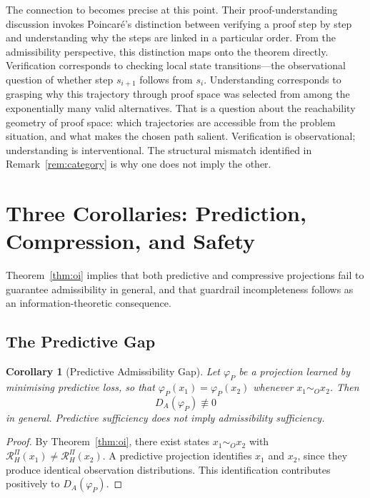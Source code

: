 \documentclass[11pt, a4paper]{article}
\theoremstyle{plain}
\newtheorem{corollary}{Corollary}
\theoremstyle{definition}
\theoremstyle{remark}
\newcommand{\simO}{\sim_O}
\newcommand{\RHP}{\mathcal{R}_H^\Pi}
\begin{document}
The connection to \citet{gupta2025world} becomes precise at this point. Their
proof-understanding discussion invokes Poincar\'e's \citeyearpar{poincare1914}
distinction between verifying a proof step by step and understanding why the
steps are linked in a particular order. From the admissibility perspective,
this distinction maps onto the theorem directly. Verification corresponds to
checking local state transitions---the observational question of whether step
$s_{i+1}$ follows from $s_i$. Understanding corresponds to grasping why this
trajectory through proof space was selected from among the exponentially many
valid alternatives. That is a question about the reachability geometry of proof
space: which trajectories are accessible from the problem situation, and what
makes the chosen path salient. Verification is observational; understanding is
interventional. The structural mismatch identified in Remark~\ref{rem:category}
is why one does not imply the other.

\section{Three Corollaries: Prediction, Compression, and Safety}

Theorem~\ref{thm:oi} implies that both predictive and compressive projections
fail to guarantee admissibility in general, and that guardrail incompleteness
follows as an information-theoretic consequence.

\subsection{The Predictive Gap}

\begin{corollary}[Predictive Admissibility Gap]
\label{cor:pred}
Let $\varphi_P$ be a projection learned by minimising predictive loss, so that
$\varphi_P(x_1) = \varphi_P(x_2)$ whenever $x_1 \simO x_2$. Then
\begin{equation}
  D_A(\varphi_P) \not\equiv 0
\end{equation}
in general. Predictive sufficiency does not imply admissibility sufficiency.
\end{corollary}

\begin{proof}
By Theorem~\ref{thm:oi}, there exist states $x_1 \simO x_2$ with
$\RHP(x_1) \neq \RHP(x_2)$. A predictive projection identifies $x_1$ and
$x_2$, since they produce identical observation distributions. This
identification contributes positively to $D_A(\varphi_P)$.
\end{proof}
\end{document}
